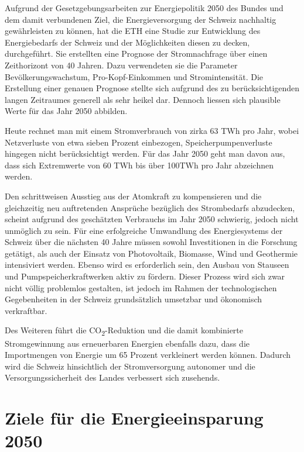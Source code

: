 Aufgrund der Gesetzgebungsarbeiten zur Energiepolitik 2050 des Bundes und dem damit verbundenen Ziel, die Energieversorgung der Schweiz nachhaltig gewährleisten zu können, hat die ETH eine Studie zur Entwicklung des Energiebedarfs der Schweiz und der Möglichkeiten diesen zu decken, durchgeführt. Sie erstellten eine Prognose der Stromnachfrage über einen Zeithorizont von 40 Jahren. Dazu verwendeten sie die Parameter Bevölkerungswachstum, Pro-Kopf-Einkommen und Stromintensität. Die Erstellung einer genauen Prognose stellte sich aufgrund des zu berücksichtigenden langen Zeitraumes generell als sehr heikel dar. Dennoch liessen sich plausible Werte für das Jahr 2050 abbilden.
\par
Heute rechnet man mit einem Stromverbrauch von zirka 63 TWh pro Jahr, wobei Netzverluste von etwa sieben Prozent einbezogen, Speicherpumpenverluste hingegen nicht berücksichtigt werden. Für das Jahr 2050 geht man davon aus, dass sich Extremwerte von 60 TWh bis über 100TWh pro Jahr abzeichnen werden.
\par
Den schrittweisen Ausstieg aus der Atomkraft zu kompensieren und die gleichzeitig neu auftretenden Ansprüche bezüglich des Strombedarfs abzudecken, scheint aufgrund des geschätzten Verbrauchs im Jahr 2050 schwierig, jedoch nicht unmöglich zu sein. Für eine erfolgreiche Umwandlung des Energiesystems der Schweiz über die nächsten 40 Jahre müssen sowohl Investitionen in die Forschung getätigt, als auch der Einsatz von Photovoltaik, Biomasse, Wind und Geothermie intensiviert werden.
Ebenso wird es erforderlich sein, den Ausbau von Stauseen und Pumpspeicherkraftwerken aktiv zu fördern. Dieser Prozess wird sich zwar nicht völlig problemlos gestalten, ist jedoch im Rahmen der technologischen Gegebenheiten in der Schweiz grundsätzlich umsetzbar und ökonomisch verkraftbar.
\par
Des Weiteren führt die CO\textsubscript{2}-Reduktion und die damit kombinierte Stromgewinnung aus erneuerbaren Energien ebenfalls dazu, dass die Importmengen von Energie um 65 Prozent verkleinert werden können. Dadurch wird die Schweiz hinsichtlich der Stromversorgung autonomer und die Versorgungssicherheit des Landes verbessert sich zusehends.
 

\section{Ziele für die Energieeinsparung 2050\cite{uvek_energie_schweiz}}

